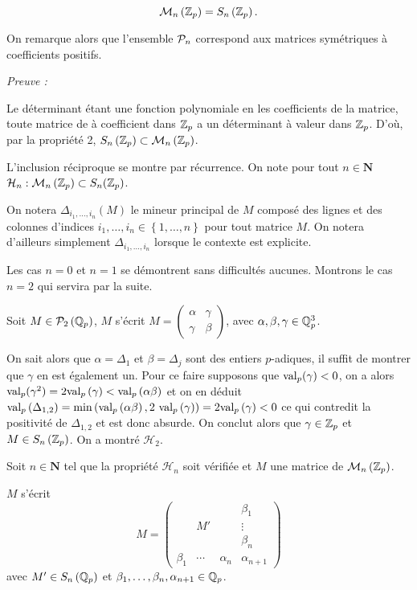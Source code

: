 \begin{prop}
	 \[
		 \Pn = S_n\left( \Zp \right) 
	.\]  
\end{prop}

\begin{remarque}
	On remarque alors que l'ensemble $\P_n$ correspond aux matrices symétriques à coefficients positifs.   
\end{remarque}
	\textit{Preuve :}

 Le déterminant étant une fonction polynomiale en les coefficients de la matrice, toute matrice de à coefficient dans $\Zp$ a un déterminant à valeur dans $\Zp$. D'où, par la propriété 2, $S_n\left( \Zp \right) \subset \Pn $.

 L'inclusion réciproque se montre par récurrence. On note pour tout $n \in \mathbf{N}$ $\mathcal{H}_n :  \Pn \subset  S_n(\Zp )$.

 
 On notera $ \Delta_{i_1,\ldots,i_n}\left( M \right) $ le mineur principal de $M$ composé des lignes et des colonnes d'indices $i_1,\ldots,i_n \in \left\{ 1,\ldots,n \right\} $ pour tout matrice $M$. On notera d'ailleurs simplement  $ \Delta_{i_1,\ldots,i_n}$ lorsque le contexte est explicite.

 Les cas $n=0$ et $n=1$ se démontrent sans difficultés aucunes. Montrons le cas $n=2$ qui servira par la suite.

 Soit $M \in \P_2\left( \Qp \right) $, $M$ s'écrit $M = \begin{pmatrix} \alpha & \gamma \\ \gamma & \beta \end{pmatrix}$, avec $\alpha, \beta, \gamma \in \Qp^3$.



 On sait alors que $ \alpha = \Delta_1$ et $ \beta = \Delta_j$ sont des entiers $p$-adiques, il suffit de montrer que $\gamma$ en est également un. Pour ce faire supposons que $ \val (\gamma) < 0$, on a alors $\val ( \gamma^2) = 2 \val\left( \gamma \right) < \val\left( \alpha \beta \right) $ et on en déduit $ \val \left( \Delta_{1,2} \right)= \min\left( \val\left( \alpha \beta \right),2~ \val \left( \gamma \right) \right) = 2 \val\left( \gamma \right) <0 $ ce qui contredit la positivité de $\Delta_{1,2}$ et est donc absurde. On conclut alors que $ \gamma \in \Zp$ et $M \in  S_n\left( \Zp \right) $. On a montré $\mathcal{H}_2$. 

 Soit $n \in \mathbf{N}$ tel que la propriété $\mathcal{H}_n $ soit vérifiée et $M$ une matrice de $\Pn$. 

 $M$ s'écrit 
 \[
 M= \left(\begin{array}{ccc|c}
  &      &     &   \beta_1  \\
  &  M'  &     &\vdots\\
  &      &     &   \beta_n  \\
\hline
\beta_1 &\cdots&  \alpha_n  & \alpha_{n+1}
\end{array} \right)
\]
avec $M' \in S_n\left( \Qp \right) $ et $\beta_1,\ldots, \beta_n, \alpha_{n+1} \in \Qp$.

